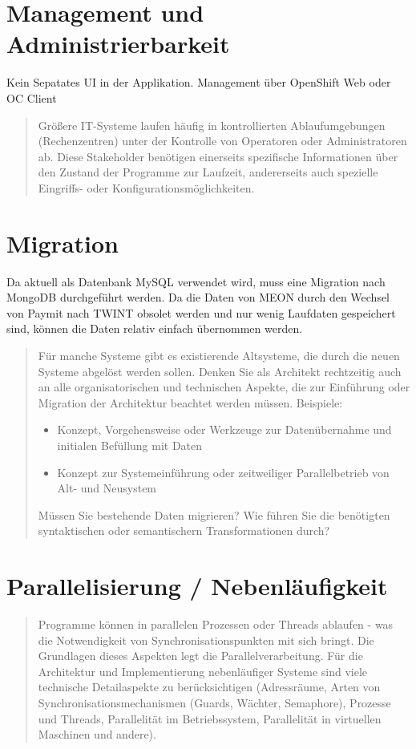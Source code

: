 \section{Management und Administrierbarkeit}

Kein Sepatates UI in der Applikation. Management über OpenShift Web oder OC Client

\begin{quote}
	Größere IT-Systeme laufen häufig in kontrollierten Ablaufumgebungen (Rechenzentren) unter der Kontrolle von Operatoren oder Administratoren ab. Diese Stakeholder benötigen einerseits spezifische Informationen über den Zustand der Programme zur Laufzeit, andererseits auch spezielle Eingriffs- oder Konfigurationsmöglichkeiten.
\end{quote}

\section{Migration}

Da aktuell als Datenbank MySQL verwendet wird, muss eine Migration nach MongoDB durchgeführt werden. Da die Daten von MEON durch den Wechsel von Paymit nach TWINT
obsolet werden und nur wenig Laufdaten gespeichert sind, können die Daten relativ einfach übernommen werden.

\begin{quote}
	Für manche Systeme gibt es existierende Altsysteme, die durch die neuen Systeme abgelöst werden sollen. Denken Sie als Architekt rechtzeitig auch an alle organisatorischen und technischen Aspekte, die zur Einführung oder Migration der Architektur beachtet werden müssen.
	Beispiele:
	\begin{itemize}
		\item Konzept, Vorgehensweise oder Werkzeuge zur Datenübernahme und initialen Befüllung mit Daten
		\item Konzept zur Systemeinführung oder zeitweiliger Parallelbetrieb von Alt- und Neusystem
	\end{itemize}
	Müssen Sie bestehende Daten migrieren? Wie führen Sie die benötigten syntaktischen oder semantischern Transformationen durch?
\end{quote}

\section{Parallelisierung / Nebenläufigkeit}

\begin{quote}
	Programme können in parallelen Prozessen oder Threads ablaufen - was die Notwendigkeit von Synchronisationspunkten mit sich bringt. Die Grundlagen dieses Aspekten legt die Parallelverarbeitung. Für die Architektur und Implementierung nebenläufiger Systeme sind viele technische Detailaspekte zu berücksichtigen (Adressräume, Arten von Synchronisationsmechanismen (Guards, Wächter, Semaphore), Prozesse und Threads, Parallelität im Betriebssystem, Parallelität in virtuellen Maschinen und andere).
\end{quote}

